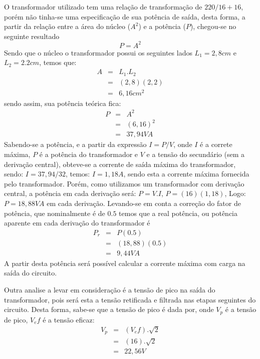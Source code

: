 \documentclass[
	article,			%
	11pt,				%
	oneside,			%
	a4paper,			%
	english,			%
	brazil,				%
	sumario=tradicional
	]{abntex2}
\begin{document}
O transformador utilizado tem uma relação de transformação de $220/16+16$, porém não tinha-se uma especificação de sua potência de saída, desta forma, a partir da relação entre a área do núcleo ($A^{2}$) e a potência ($P$), chegou-se no seguinte resultado
\begin{equation}
P = A^{2}
\end{equation}
Sendo que o núcleo o transformador possui os seguintes lados
$L_1 = 2,8cm$ e $L_2 = 2.2cm$, temos que:
\begin{eqnarray}
A &=& L_1.L_2 \nonumber\\
&=&(2,8)(2,2)\nonumber\\
&=&6,16cm^{2}
\end{eqnarray}
sendo assim, sua potência teórica fica:
\begin{eqnarray}
P &=& A^{2}\nonumber\\
&=&(6,16)^{2}\nonumber\\
&=&37,94VA
\end{eqnarray}
Sabendo-se a potência, e a partir da expressão $I = P/V$, onde $I$ é a correte máxima, $P$ é a potência do transformador e $V$ e a tensão do secundário (sem a derivação central), obteve-se a corrente de saída máxima do transformador, sendo: $I = 37,94/32$, temos: $I = 1,18A$, sendo esta a corrente máxima fornecida pelo transformador. Porém, como utilizamos um transformador com derivação central, a potência em cada derivação será: $P = V.I$, $P = (16)(1,18)$, Logo: $P = 18,88VA$ em cada derivação. Levando-se em conta a correção do fator de potência, que nominalmente é de $0.5$ temos que a real potência, ou potência aparente em cada derivação do transformador é
\begin{eqnarray}
P_r &=& P(0.5)\nonumber\\
&=&(18,88)(0.5)\nonumber\\
&=&9,44VA
\end{eqnarray}
A partir desta potência será possível calcular a corrente máxima com carga na saída do circuito.

Outra analise a levar em consideração é a tensão de pico na saída do transformador, pois será esta a tensão retificada e filtrada nas etapas seguintes do circuito. Desta forma, sabe-se que a tensão de pico é dada por, onde $V_p$ é a tensão de pico, $V_ef$ é a tensão eficaz: 
\begin{eqnarray}
V_p &=& (V_ef).\sqrt{2}\nonumber\\
&=& (16).\sqrt{2}\nonumber\\
&=& 22,56V
\end{eqnarray}
\end{document}
